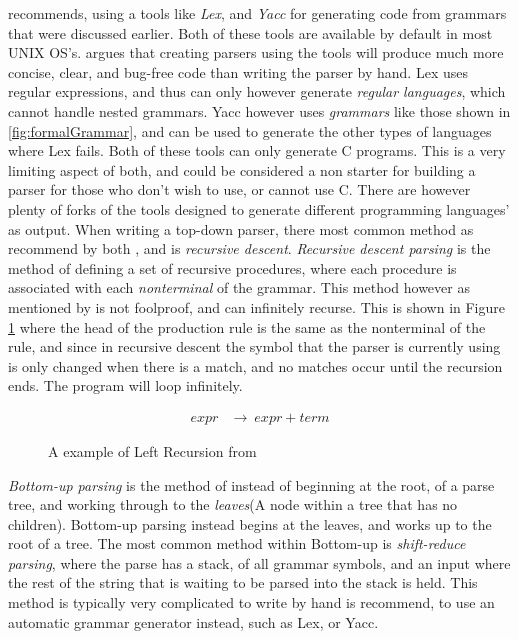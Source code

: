 \citep{DragonBook} recommends, using a tools like \emph{Lex}, and \emph{Yacc} for generating code from grammars that were discussed earlier. Both of these tools are available by default in most UNIX OS's. \citep{LexYacc} argues that creating parsers using the tools will produce much more concise, clear, and bug-free code than writing the parser by hand. Lex uses regular expressions, and thus can only however generate \emph{regular languages}, which cannot handle nested grammars. Yacc however uses \emph{grammars} like those shown in \ref{fig:formalGrammar}, and can be used to generate the other types of languages where Lex fails. Both of these tools can only generate C programs. This is a very limiting aspect of both, and could be considered a non starter for building a parser for those who don't wish to use, or cannot use C. There are however plenty of forks of the tools designed to generate different programming languages' as output.
\newpage
When writing a top-down parser, there most common method as recommend by both \citep{DragonBook}, and \citep{ParseTech} is \emph{recursive descent}. \emph{Recursive descent parsing} is the method of defining a set of recursive procedures, where each procedure is associated with each \emph{nonterminal} of the grammar. This method however as mentioned by \citep{DragonBook} is not foolproof, and can infinitely recurse. This is shown in Figure \ref{fig:leftR} where the head of the production rule is the same as the nonterminal of the rule, and since in recursive descent the symbol that the parser is currently using is only changed when there is a match, and no matches occur until the recursion ends. The program will loop infinitely.

\begin{figure}[ht!]
    \begin{align*}
        expr &\rightarrow\ expr + term
    \end{align*}
    \caption{A example of Left Recursion from \citep{DragonBook}}
    \label{fig:leftR}
\end{figure}
\emph{Bottom-up parsing} is the method of instead of beginning at the root, of a parse tree, and working through to the \emph{leaves}(A node within a tree that has no children). Bottom-up parsing instead begins at the leaves, and works up to the root of a tree. The most common method within Bottom-up is \emph{shift-reduce parsing}, where the parse has a stack, of all grammar symbols, and an input where the rest of the string that is waiting to be parsed into the stack is held. This method is typically very complicated to write by hand is recommend, to use an automatic grammar generator instead, such as Lex, or Yacc.

